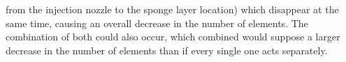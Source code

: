 from the injection nozzle to the sponge layer location) which disappear at the same time, causing an overall decrease in the number of elements. The combination of both could also occur, which combined would suppose a larger decrease in the number of elements than if every single one acts separately.

%
%
